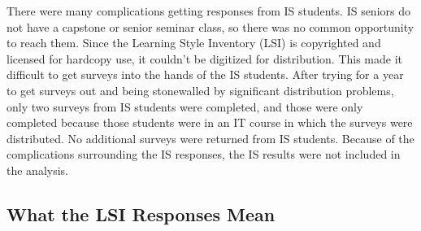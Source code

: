 There were many complications getting responses from IS students. IS seniors do not have a capstone or senior seminar class, so there was no common opportunity to reach them. Since the Learning Style Inventory (LSI) is copyrighted and licensed for hardcopy use, it couldn't be digitized for distribution. This made it difficult to get surveys into the hands of the IS students. After trying for a year to get surveys out and being stonewalled by significant distribution problems, only two surveys from IS students were completed, and those were only completed because those students were in an IT course in which the surveys were distributed. No additional surveys were returned from IS students. Because of the complications surrounding the IS responses, the IS results were not included in the analysis.

\subsection{What the LSI Responses Mean}

